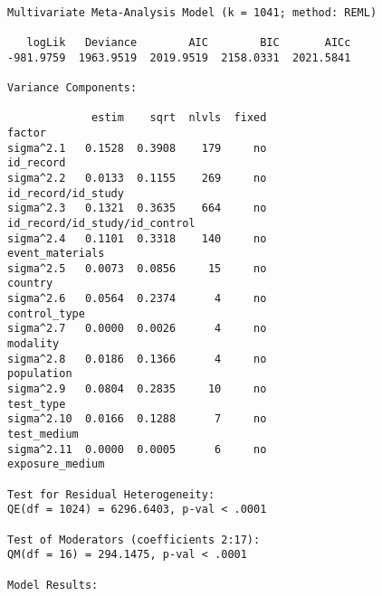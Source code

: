 \documentclass[
  letterpaper,
  DIV=11,
  numbers=noendperiod]{scrartcl}
\begin{document}
\begin{verbatim}

Multivariate Meta-Analysis Model (k = 1041; method: REML)

   logLik   Deviance        AIC        BIC       AICc   
-981.9759  1963.9519  2019.9519  2158.0331  2021.5841   

Variance Components:

             estim    sqrt  nlvls  fixed                         factor 
sigma^2.1   0.1528  0.3908    179     no                      id_record 
sigma^2.2   0.0133  0.1155    269     no             id_record/id_study 
sigma^2.3   0.1321  0.3635    664     no  id_record/id_study/id_control 
sigma^2.4   0.1101  0.3318    140     no                event_materials 
sigma^2.5   0.0073  0.0856     15     no                        country 
sigma^2.6   0.0564  0.2374      4     no                   control_type 
sigma^2.7   0.0000  0.0026      4     no                       modality 
sigma^2.8   0.0186  0.1366      4     no                     population 
sigma^2.9   0.0804  0.2835     10     no                      test_type 
sigma^2.10  0.0166  0.1288      7     no                    test_medium 
sigma^2.11  0.0000  0.0005      6     no                exposure_medium 

Test for Residual Heterogeneity:
QE(df = 1024) = 6296.6403, p-val < .0001

Test of Moderators (coefficients 2:17):
QM(df = 16) = 294.1475, p-val < .0001

Model Results:


\end{verbatim}
\end{document}
